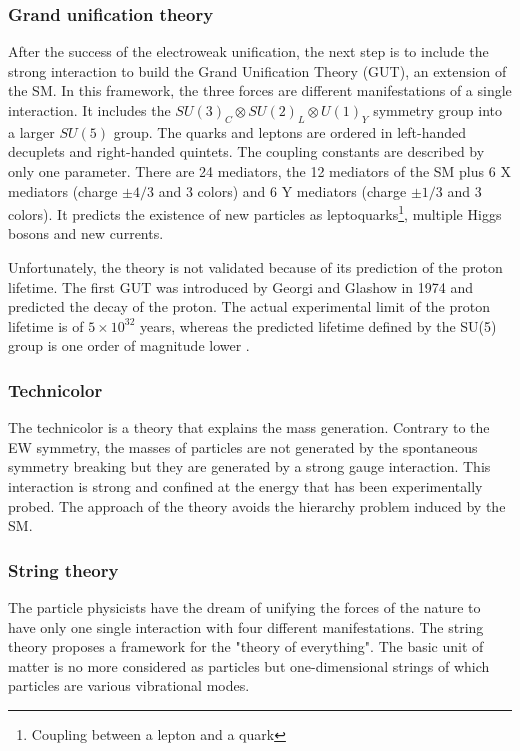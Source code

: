       \subsubsection{Grand unification theory}
      
      After the success of the electroweak unification, the next step is to include the strong interaction to build the Grand Unification Theory (GUT), an extension of the \gls{SM}.
      In this framework, the three forces are different manifestations of a single interaction. 
      It includes the $SU(3)_C \otimes SU(2)_L \otimes U(1)_Y$ symmetry group into a larger $SU(5)$ group. 
      The quarks and leptons are ordered in left-handed decuplets and right-handed quintets.
      The coupling constants are described by only one parameter.  
      There are 24 mediators, the 12 mediators of the \gls{SM} plus 6 X mediators (charge $\pm4/3$ and 3 colors) and 6 Y mediators (charge $\pm1/3$ and 3 colors).
      It predicts the existence of new particles as leptoquarks\footnote{Coupling between a lepton and a quark}, multiple Higgs bosons and new currents.

      Unfortunately, the theory is not validated because of its prediction of the proton lifetime. 
      The first GUT was introduced by Georgi and Glashow in 1974 and predicted the decay of the proton. 
      The actual experimental limit of the proton lifetime is of $5 \times 10^{32}$ years, whereas the predicted lifetime defined by the SU(5) group is one order of magnitude lower \cite{Agashe:2014kda}.

      \subsubsection{Technicolor}

      The technicolor is a theory that explains the mass generation.
      Contrary to the EW symmetry, the masses of particles are not generated by the spontaneous symmetry breaking but they are generated by a strong gauge interaction.
      This interaction is strong and confined at the energy that has been experimentally probed.
      The approach of the theory avoids the hierarchy problem induced by the \gls{SM}.
      
      \subsubsection{String theory}

      The particle physicists have the dream of unifying the forces of the nature to have only one single interaction with four different manifestations.
      The string theory proposes a framework for the "theory of everything".
      The basic unit of matter is no more considered as particles but one-dimensional strings of which particles are various vibrational modes.

